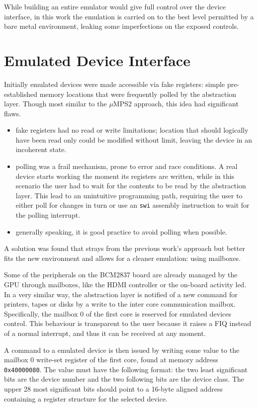 \documentclass[12pt,a4paper,openright,twoside]{report}
\begin{document}
While building an entire emulator would give full control over the device interface,
in this work the emulation is carried on to the best level permitted by a bare
metal environment, leaking some imperfections on the exposed controls.

\section{Emulated Device Interface}
Initially emulated devices were made accessible via fake registers: simple pre-established
memory locations that were frequently polled by the abstraction layer.
Though most similar to the $\mu$MPS2 approach, this idea had significant flaws.
\begin{itemize}
    \item fake registers had no read or write limitations; location that should
        logically have been read only could be modified without limit, leaving
        the device in an incoherent state.
    \item polling was a frail mechanism, prone to error and race conditions. 
         A real device starts working the moment
        its registers are written, while in this scenario the user had to wait 
        for the contents to be read by the abstraction layer. This lead to 
        an unintuitive programming path, requiring the user to either poll 
        for changes in turn or use an {\tt swi} assembly instruction to wait for
        the polling interrupt.
    \item generally speaking, it is good practice to avoid polling when possible.
\end{itemize}

A solution was found that strays from the previous work's approach but better
fits the new environment and allows for a cleaner emulation: using mailboxes.

Some of the peripherals on the BCM2837 board are already managed by the GPU
through mailboxes, like the HDMI controller or the on-board activity led. In 
a very similar way, the abstraction layer is notified of a new command for printers,
tapes or disks by a write to the inter core communication mailbox.
Specifically, the mailbox 0 of the first core is reserved for emulated devices control.
This behaviour is transparent to the user because it raises a FIQ instead of a 
normal interrupt, and thus it can be received at any moment.

A command to a emulated device is then issued by writing some value to the mailbox
0 write-set register of the first core, found at memory address {\tt 0x40000080}.
The value must have the following format: the two least significant bits are the
device number and the two following bits are the device class.
The upper 28 most significant bits should point to a 16-byte aligned address containing
a register structure for the selected device.
\end{document}
